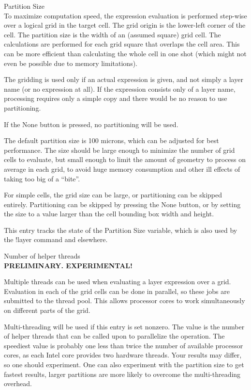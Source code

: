 \begin{description}
\item{\cb Partition Size}\\
To maximize computation speed, the expression evaluation is performed
step-wise over a logical grid in the target cell.  The grid origin is
the lower-left corner of the cell.  The partition size is the width of
an (assumed square) grid cell.  The calculations are performed for
each grid square that overlaps the cell area.  This can be more
efficient than calculating the whole cell in one shot (which might not
even be possible due to memory limitations).

The gridding is used only if an actual expression is given, and not
simply a layer name (or no expression at all).  If the expression
consists only of a layer name, processing requires only a simple copy
and there would be no reason to use partitioning.

If the {\cb None} button is pressed, no partitioning will be used.

The default partition size is 100 microns, which can be adjusted for
best performance.  The size should be large enough to minimize the
number of grid cells to evaluate, but small enough to limit the amount
of geometry to process on average in each grid, to avoid huge memory
consumption and other ill effects of taking too big of a ``bite''.

For simple cells, the grid size can be large, or partitioning can be
skipped entirely.  Partitioning can be skipped by pressing the {\cb
None} button, or by setting the size to a value larger than the cell
bounding box width and height.

This entry tracks the state of the {\cb Partition Size} variable,
which is also used by the {\cb !layer} command and elsewhere.

\item{\cb Number of helper threads}\\
{\bf PRELIMINARY. EXPERIMENTAL!}

Multiple threads can be used when evaluating a layer expression over a
grid.  Evaluation in each of the grid cells can be done in parallel,
so these jobs are submitted to the thread pool.  This allows processor
cores to work simultaneously on different parts of the grid.
  
Multi-threading will be used if this entry is set nonzero.  The value
is the number of helper threads that can be called upon to parallelize
the operation.  The speediest value is probably one less than twice
the number of available processor cores, as each Intel core provides
two hardware threads.  Your results may differ, so one should
experiment.  One can also experiment with the partition size to get
fastest results, larger partitions are more likely to overcome the
multi-threading overhead.


\end{description}
